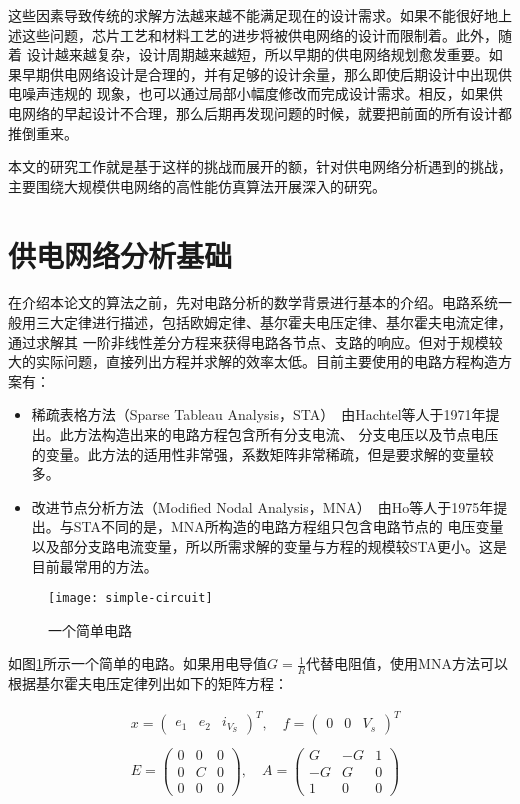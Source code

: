 这些因素导致传统的求解方法越来越不能满足现在的设计需求。如果不能很好地上述这些问题，芯片工艺和材料工艺的进步将被供电网络的设计而限制着。此外，随着
设计越来越复杂，设计周期越来越短，所以早期的供电网络规划愈发重要。如果早期供电网络设计是合理的，并有足够的设计余量，那么即使后期设计中出现供电噪声违规的
现象，也可以通过局部小幅度修改而完成设计需求。相反，如果供电网络的早起设计不合理，那么后期再发现问题的时候，就要把前面的所有设计都推倒重来。

本文的研究工作就是基于这样的挑战而展开的额，针对供电网络分析遇到的挑战，主要围绕大规模供电网络的高性能仿真算法开展深入的研究。

\section{供电网络分析基础}

在介绍本论文的算法之前，先对电路分析的数学背景进行基本的介绍。电路系统一般用三大定律进行描述，包括欧姆定律、基尔霍夫电压定律、基尔霍夫电流定律，通过求解其
一阶非线性差分方程来获得电路各节点、支路的响应。但对于规模较大的实际问题，直接列出方程并求解的效率太低。目前主要使用的电路方程构造方案有：

\begin{itemize}
 \item 稀疏表格方法（Sparse Tableau Analysis，STA）~\cite{hachtel1971sparse}由Hachtel等人于1971年提出。此方法构造出来的电路方程包含所有分支电流、
 分支电压以及节点电压的变量。此方法的适用性非常强，系数矩阵非常稀疏，但是要求解的变量较多。
 \item 改进节点分析方法（Modified Nodal Analysis，MNA）~\cite{ho1975modified}由Ho等人于1975年提出。与STA不同的是，MNA所构造的电路方程组只包含电路节点的
 电压变量以及部分支路电流变量，所以所需求解的变量与方程的规模较STA更小。这是目前最常用的方法。
 \end{itemize}

 \begin{figure}[H]
   \centering
   \texttt{[image: simple-circuit]}
   \caption{一个简单电路}
   \label{fig:figsimplecircuit}
 \end{figure}

 如图\ref{fig:figsimplecircuit}所示一个简单的电路。如果用电导值$G=\frac{1}{R}$代替电阻值，使用MNA方法可以根据基尔霍夫电压定律列出如下的矩阵方程：

\begin{align*}
 & x=\begin{pmatrix}e_1 & e_2 & i_{V_S}\end{pmatrix}^T, \quad  f=\begin{pmatrix}0 & 0 & V_s \end{pmatrix}^T \\
 \\
 & E=\begin{pmatrix}0&0&0\\ 0&C&0\\ 0&0&0 \end{pmatrix}, \quad A=\begin{pmatrix}G&-G&1\\ -G&G&0\\ 1&0&0 \end{pmatrix}
  \end{align*}

